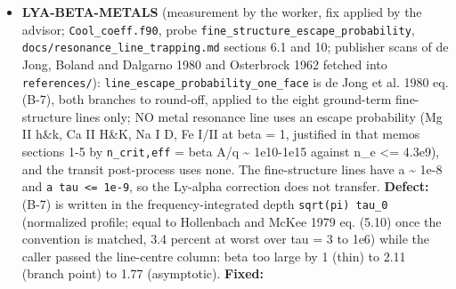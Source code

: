 \documentclass[english,a4paper]{my_memo}
\begin{document}
\begin{itemize}
  parameter block, and \texttt{metal\_photoion\_sigma} makes \texttt{phfit2}\textquotesingle s handover:
  the 1996 outer-shell fit below \texttt{E\_max}, the 1995 fit of the same shell at
  and above it (MEASURED: \texttt{einn} of \texttt{phfit2} equals \texttt{photo.dat}\textquotesingle s \texttt{E\_max}
  for all sixteen metal rows; the production routine reproduces \texttt{phfit2}\textquotesingle s
  outer shell to 1e-10 at 17 ions x 12 energies where 110 of 204 rows
  disagreed before, worst Fe I at 1240 eV 24.9 Mb against 0.00172 Mb, a
  factor 14464). Inner shells still absent by decision item 7 (option (a)
  recommended; the measured sizes now in that item). Impact (scratch,
  metals-off \texttt{mol\_base\_handoff} byte-identical): \texttt{wasp\_full} 300 v 0.15, T
  4.7e-2, heat 7.8e-2, Fe III 0.99, C III 0.60 relative (hard photons now
  reach the base, the top stages fall at small radius; metal share of the
  heating at the base 17.4 -\textgreater{} 8.5 percent); \texttt{mol\_metals} 400 v 0.56, heat
  0.42; \texttt{lower\_profile} 200 heat 8.3e-3; log10 Mdot unchanged to 0.01 dex in
  the bounded snapshots. Both Mg thresholds already agree with NIST to their
  digits (item 4 needed no move; provenance note pending \texttt{parameters.f90}).
\item
  \textbf{LYA-BETA-METALS} (measurement by the worker, fix applied by the
  advisor; \texttt{Cool\_coeff.f90}, probe \texttt{fine\_structure\_escape\_probability},
  \texttt{docs/resonance\_line\_trapping.md} sections 6.1 and 10; publisher scans of
  de Jong, Boland and Dalgarno 1980 and Osterbrock 1962 fetched into
  \texttt{references/}): \texttt{line\_escape\_probability\_one\_face} is de Jong et al. 1980
  eq. (B-7), both branches to round-off, applied to the eight ground-term
  fine-structure lines only; NO metal resonance line uses an escape
  probability (Mg II h\&k, Ca II H\&K, Na I D, Fe I/II at beta = 1, justified
  in that memo\textquotesingle s sections 1-5 by \texttt{n\_crit,eff} = beta A/q \textasciitilde{} 1e10-1e15 against
  n\_e \textless= 4.3e9), and the transit post-process uses none. The fine-structure
  lines have a \textasciitilde{} 1e-8 and \texttt{a\ tau\ \textless{}=\ 1e-9}, so the Ly-alpha correction does
  not transfer. \textbf{Defect:} (B-7) is written in the frequency-integrated
  depth \texttt{sqrt(pi)\ tau\_0} (normalized profile; equal to Hollenbach and McKee
  1979 eq. (5.10) once the convention is matched, 3.4 percent at worst over
  tau = 3 to 1e6) while the caller passed the line-centre column: beta too
  large by 1 (thin) to 2.11 (branch point) to 1.77 (asymptotic). \textbf{Fixed:}

\end{itemize}
\end{document}
